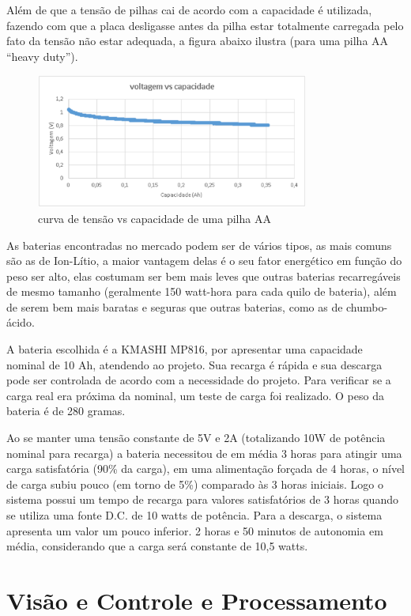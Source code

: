 Além de que a tensão de pilhas cai de acordo com a capacidade é utilizada, fazendo com que a placa desligasse antes da pilha estar totalmente carregada pelo fato da tensão não estar adequada, a figura abaixo ilustra (para uma pilha AA “heavy duty”).

\begin{figure}[H]
    \centering
    \includegraphics[width=0.8\textwidth]{figuras/volt_vs_cap.eps}
    \caption{curva de tensão vs capacidade de uma pilha AA}
    \label{fig:volts}
\end{figure}

As baterias encontradas no mercado podem ser de vários tipos, as mais comuns são as de Ion-Lítio, a maior vantagem delas é o seu fator energético em função do peso ser alto, elas costumam ser bem mais leves que outras baterias recarregáveis de mesmo tamanho (geralmente 150 watt-hora para cada quilo de bateria), além de serem bem mais baratas e seguras que outras baterias, como as de chumbo-ácido.

A bateria escolhida é a KMASHI MP816, por apresentar uma capacidade nominal de 10 Ah, atendendo ao projeto. Sua recarga é rápida e sua descarga pode ser controlada de acordo com a necessidade do projeto.  Para verificar se a carga real era próxima da nominal, um teste de carga foi realizado. O peso da bateria é de 280 gramas.

Ao se manter uma tensão constante de 5V e 2A (totalizando 10W de potência nominal para recarga) a bateria necessitou de em média 3 horas para atingir uma carga satisfatória (90\% da carga), em uma alimentação forçada de 4 horas, o nível de carga subiu pouco (em torno de 5\%) comparado às 3 horas iniciais. Logo o sistema possui um tempo de recarga para valores satisfatórios de 3 horas quando se utiliza uma fonte D.C. de 10 watts de potência. Para a descarga, o sistema apresenta um valor um pouco inferior. 2 horas e 50 minutos de autonomia em média, considerando que a carga será constante de 10,5 watts.


\section{Visão e Controle e Processamento}

